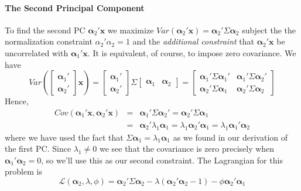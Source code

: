 \paragraph{The Second Principal Component}
To find the second PC $\boldsymbol{\alpha}_2' \mathbf{x}$ we maximize $Var(\boldsymbol{\alpha}_2' \mathbf{x}) =\boldsymbol{\alpha}_2' \Sigma \boldsymbol{\alpha}_2$ subject the the normalization constraint $\alpha_2' \alpha_2 = 1$ and the \emph{additional constraint} that $\boldsymbol{\alpha}_2' \mathbf{x}$ be uncorrelated with $\boldsymbol{\alpha}_1' \mathbf{x}$. It is equivalent, of course, to impose zero covariance. We have
$$Var\left(\left[\begin{array}
	{cc} \boldsymbol{\alpha}_1' \\ \boldsymbol{\alpha}_2'
\end{array} \right] \textbf{x}\right) = \left[\begin{array}
	{c} \boldsymbol{\alpha}_1' \\ \boldsymbol{\alpha}_2'
\end{array} \right] \Sigma \left[\begin{array}
	{cc} \boldsymbol{\alpha}_1 & \boldsymbol{\alpha}_2
\end{array}\right] = \left[ \begin{array}
	{cc} \boldsymbol{\alpha}_1' \Sigma \boldsymbol{\alpha}_1' & \boldsymbol{\alpha}_1'\Sigma \boldsymbol{\alpha}_2'\\
	\boldsymbol{\alpha}_2' \Sigma \boldsymbol{\alpha}_1 & \boldsymbol{\alpha}_2' \Sigma \boldsymbol{\alpha}_2
\end{array}\right]$$
Hence,
\begin{eqnarray*}
	Cov\left(\boldsymbol{\alpha}_1' \mathbf{x}, \boldsymbol{\alpha}_2' \mathbf{x} \right) &=& \boldsymbol{\alpha}_1'\Sigma \boldsymbol{\alpha}_2' = \boldsymbol{\alpha}_2' \Sigma \boldsymbol{\alpha}_1 \\
		&=&\boldsymbol{\alpha}_2'\lambda_1 \boldsymbol{\alpha}_1 = \lambda_1\boldsymbol{\alpha}_2'\boldsymbol{\alpha}_1 =  \lambda_1\boldsymbol{\alpha}_1'\boldsymbol{\alpha}_2 
\end{eqnarray*}
where we have used the fact that $\Sigma \boldsymbol{\alpha}_1 = \lambda_1 \boldsymbol{\alpha}_1$ as we found in our derivation of the first PC. Since $\lambda_1 \neq 0$ we see that the covariance is zero precisely when $\boldsymbol{\alpha}_1'\boldsymbol{\alpha}_2  = 0$, so we'll use this as our second constraint. The Lagrangian for this problem is 
	$$\mathcal{L}(\boldsymbol{\alpha}_2, \lambda, \phi) = \boldsymbol{\alpha}_2'\Sigma\boldsymbol{\alpha}_2  - \lambda(\boldsymbol{\alpha}_2'\boldsymbol{\alpha}_2 - 1) - \phi \boldsymbol{\alpha}_2' \boldsymbol{\alpha}_1$$
